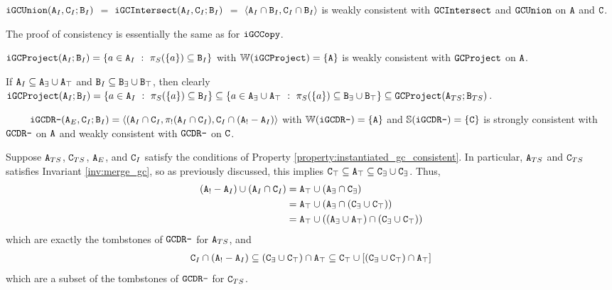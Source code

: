 \begin{example}
$\tt{iGCUnion}(\tt{A}_I, \tt{C}_I; \tt{B}_I)$ $=$ $\tt{iGCIntersect}(\tt{A}_I, \tt{C}_I; \tt{B}_I)$ $=$ $\langle \tt{A}_I \cap \tt{B}_I, \tt{C}_I \cap \tt{B}_I \rangle$ is weakly consistent with $\tt{GCIntersect}$ and $\tt{GCUnion}$ on $\tt{A}$ and $\tt{C}$.
\end{example}
The proof of consistency is essentially the same as for $\tt{iGCCopy}$.

\begin{example}[Project GC]
$\tt{iGCProject}(\tt{A}_I; \tt{B}_I) = \{a \in \tt{A}_I ~:~ \pi_S(\{a\}) \subseteq \tt{B}_I\}$ with $\mathbb{W}(\tt{iGCProject}) = \{\tt{A}\}$ is weakly consistent with $\tt{GCProject}$ on $\tt{A}$.
\end{example}

If $\tt{A}_I \subseteq \tt{A}_\exists \cup \tt{A}_\top$ and $\tt{B}_I \subseteq \tt{B}_\exists \cup \tt{B}_\top$, then
clearly $\tt{iGCProject}(\tt{A}_I; \tt{B}_I) = \{a \in \tt{A}_I ~:~ \pi_S(\{a\}) \subseteq \tt{B}_I\} \subseteq \{a \in \tt{A}_\exists \cup \tt{A}_\top ~:~ \pi_S(\{a\}) \subseteq \tt{B}_\exists \cup \tt{B}_\top\} \subseteq \tt{GCProject}(\tt{A}_{TS}; \tt{B}_{TS})$.

\begin{example}
\label{ex:instantiated:dr-}
$\qquad$
$\tt{iGCDR-}(\tt{A}_E, \tt{C}_I; \tt{B}_I) = \langle (\tt{A}_I \cap \tt{C}_I, \pi_!(\tt{A}_I \cap \tt{C}_I), \tt{C}_I \cap (\tt{A}_! - \tt{A}_I)\rangle$ with $\mathbb{W}(\tt{iGCDR-}) = \{\tt{A}\}$ and $\mathbb{S}(\tt{iGCDR-}) = \{\tt{C}\}$ is strongly consistent with $\tt{GCDR-}$ on $\tt{A}$ and weakly consistent with $\tt{GCDR-}$ on $\tt{C}$.
\end{example}
Suppose $\tt{A}_{TS}$, $\tt{C}_{TS}$, $\tt{A}_E$, and $\tt{C}_I$ satisfy the conditions of Property \ref{property:instantiated_gc_consistent}.
In particular, $\tt{A}_{TS}$ and $\tt{C}_{TS}$ satisfies Invariant \ref{inv:merge_gc}, so as previously discussed, this implies $\tt{C}_\top \subseteq \tt{A}_\top \subseteq \tt{C}_\exists \cup \tt{C}_\exists$.
Thus,
\begin{align*}
(\tt{A}_! - \tt{A}_I) \cup (\tt{A}_I \cap \tt{C}_I)
&= \tt{A}_\top \cup (\tt{A}_\exists \cap \tt{C}_\exists)\\
&= \tt{A}_\top \cup (\tt{A}_\exists \cap (\tt{C}_\exists \cup \tt{C}_\top))\\
&= \tt{A}_\top \cup ((\tt{A}_\exists \cup \tt{A}_\top) \cap (\tt{C}_\exists \cup \tt{C}_\top))
\end{align*}
which are exactly the tombstones of $\tt{GCDR-}$ for $\tt{A}_{TS}$, and
\begin{align*}
\tt{C}_I \cap (\tt{A}_! - \tt{A}_I) \subseteq (\tt{C}_\exists \cup \tt{C}_\top) \cap \tt{A}_\top \subseteq \tt{C}_\top \cup [(\tt{C}_\exists \cup \tt{C}_\top) \cap \tt{A}_\top]
\end{align*}
which are a subset of the tombstones of $\tt{GCDR-}$ for $\tt{C}_{TS}$.


